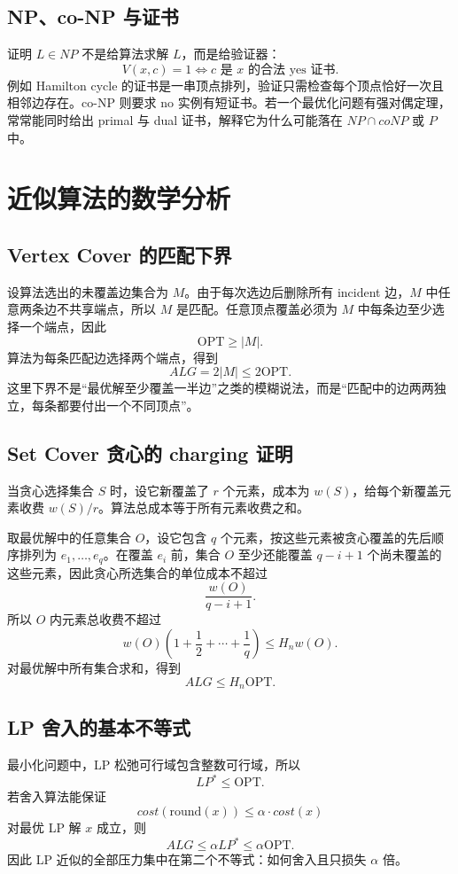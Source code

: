\documentclass[UTF8,openany,12pt]{ctexbook}
\theoremstyle{remark}
\newcommand{\OPT}{\mathrm{OPT}}
\begin{document}
\subsection{NP、co-NP 与证书}
证明 $L\in NP$ 不是给算法求解 $L$，而是给验证器：
\[
V(x,c)=1 \iff c\text{ 是 }x\text{ 的合法 yes 证书}.
\]
例如 Hamilton cycle 的证书是一串顶点排列，验证只需检查每个顶点恰好一次且相邻边存在。co-NP 则要求 no 实例有短证书。若一个最优化问题有强对偶定理，常常能同时给出 primal 与 dual 证书，解释它为什么可能落在 $NP\cap coNP$ 或 $P$ 中。

\section{近似算法的数学分析}
\subsection{Vertex Cover 的匹配下界}
设算法选出的未覆盖边集合为 $M$。由于每次选边后删除所有 incident 边，$M$ 中任意两条边不共享端点，所以 $M$ 是匹配。任意顶点覆盖必须为 $M$ 中每条边至少选择一个端点，因此
\[
\OPT\ge |M|.
\]
算法为每条匹配边选择两个端点，得到
\[
ALG=2|M|\le 2\OPT.
\]
这里下界不是“最优解至少覆盖一半边”之类的模糊说法，而是“匹配中的边两两独立，每条都要付出一个不同顶点”。

\subsection{Set Cover 贪心的 charging 证明}
当贪心选择集合 $S$ 时，设它新覆盖了 $r$ 个元素，成本为 $w(S)$，给每个新覆盖元素收费 $w(S)/r$。算法总成本等于所有元素收费之和。

取最优解中的任意集合 $O$，设它包含 $q$ 个元素，按这些元素被贪心覆盖的先后顺序排列为 $e_1,\dots,e_q$。在覆盖 $e_i$ 前，集合 $O$ 至少还能覆盖 $q-i+1$ 个尚未覆盖的这些元素，因此贪心所选集合的单位成本不超过
\[
\frac{w(O)}{q-i+1}.
\]
所以 $O$ 内元素总收费不超过
\[
w(O)\left(1+\frac12+\cdots+\frac1q\right)\le H_n w(O).
\]
对最优解中所有集合求和，得到
\[
ALG\le H_n\OPT.
\]

\subsection{LP 舍入的基本不等式}
最小化问题中，LP 松弛可行域包含整数可行域，所以
\[
LP^*\le \OPT.
\]
若舍入算法能保证
\[
cost(\text{round}(x))\le \alpha\cdot cost(x)
\]
对最优 LP 解 $x$ 成立，则
\[
ALG\le \alpha LP^*\le \alpha\OPT.
\]
因此 LP 近似的全部压力集中在第二个不等式：如何舍入且只损失 $\alpha$ 倍。
\end{document}
